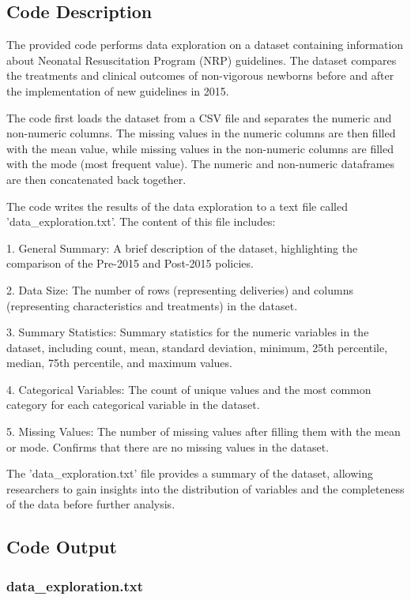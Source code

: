 \documentclass[11pt]{article}
\begin{document}
\subsection{Code Description}

The provided code performs data exploration on a dataset containing information about Neonatal Resuscitation Program (NRP) guidelines. The dataset compares the treatments and clinical outcomes of non-vigorous newborns before and after the implementation of new guidelines in 2015. 

The code first loads the dataset from a CSV file and separates the numeric and non-numeric columns. The missing values in the numeric columns are then filled with the mean value, while missing values in the non-numeric columns are filled with the mode (most frequent value). The numeric and non-numeric dataframes are then concatenated back together.

The code writes the results of the data exploration to a text file called 'data\_exploration.txt'. The content of this file includes:

1. General Summary: A brief description of the dataset, highlighting the comparison of the Pre-2015 and Post-2015 policies.

2. Data Size: The number of rows (representing deliveries) and columns (representing characteristics and treatments) in the dataset.

3. Summary Statistics: Summary statistics for the numeric variables in the dataset, including count, mean, standard deviation, minimum, 25th percentile, median, 75th percentile, and maximum values.

4. Categorical Variables: The count of unique values and the most common category for each categorical variable in the dataset.

5. Missing Values: The number of missing values after filling them with the mean or mode. Confirms that there are no missing values in the dataset.

The 'data\_exploration.txt' file provides a summary of the dataset, allowing researchers to gain insights into the distribution of variables and the completeness of the data before further analysis.

\subsection{Code Output}

\subsubsection*{data\_exploration.txt}
\end{document}
